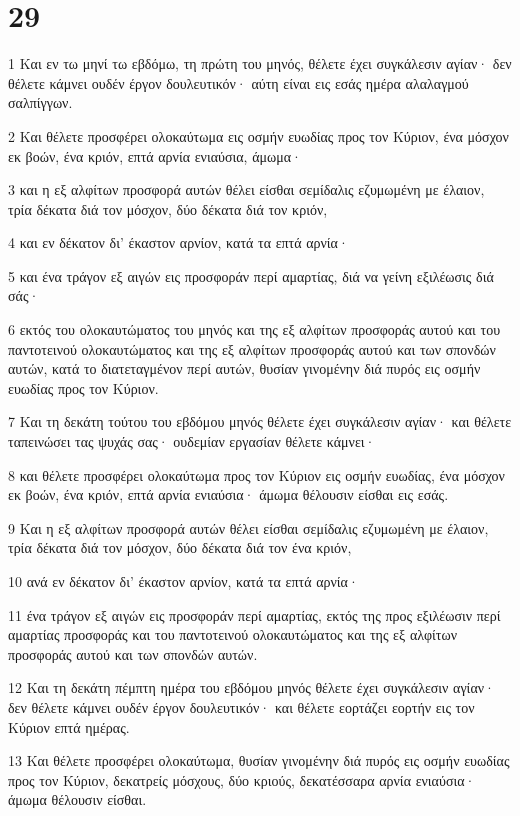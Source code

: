 \chapter{29}

\par 1 Και εν τω μηνί τω εβδόμω, τη πρώτη του μηνός, θέλετε έχει συγκάλεσιν αγίαν· δεν θέλετε κάμνει ουδέν έργον δουλευτικόν· αύτη είναι εις εσάς ημέρα αλαλαγμού σαλπίγγων.
\par 2 Και θέλετε προσφέρει ολοκαύτωμα εις οσμήν ευωδίας προς τον Κύριον, ένα μόσχον εκ βοών, ένα κριόν, επτά αρνία ενιαύσια, άμωμα·
\par 3 και η εξ αλφίτων προσφορά αυτών θέλει είσθαι σεμίδαλις εζυμωμένη με έλαιον, τρία δέκατα διά τον μόσχον, δύο δέκατα διά τον κριόν,
\par 4 και εν δέκατον δι' έκαστον αρνίον, κατά τα επτά αρνία·
\par 5 και ένα τράγον εξ αιγών εις προσφοράν περί αμαρτίας, διά να γείνη εξιλέωσις διά σάς·
\par 6 εκτός του ολοκαυτώματος του μηνός και της εξ αλφίτων προσφοράς αυτού και του παντοτεινού ολοκαυτώματος και της εξ αλφίτων προσφοράς αυτού και των σπονδών αυτών, κατά το διατεταγμένον περί αυτών, θυσίαν γινομένην διά πυρός εις οσμήν ευωδίας προς τον Κύριον.
\par 7 Και τη δεκάτη τούτου του εβδόμου μηνός θέλετε έχει συγκάλεσιν αγίαν· και θέλετε ταπεινώσει τας ψυχάς σας· ουδεμίαν εργασίαν θέλετε κάμνει·
\par 8 και θέλετε προσφέρει ολοκαύτωμα προς τον Κύριον εις οσμήν ευωδίας, ένα μόσχον εκ βοών, ένα κριόν, επτά αρνία ενιαύσια· άμωμα θέλουσιν είσθαι εις εσάς.
\par 9 Και η εξ αλφίτων προσφορά αυτών θέλει είσθαι σεμίδαλις εζυμωμένη με έλαιον, τρία δέκατα διά τον μόσχον, δύο δέκατα διά τον ένα κριόν,
\par 10 ανά εν δέκατον δι' έκαστον αρνίον, κατά τα επτά αρνία·
\par 11 ένα τράγον εξ αιγών εις προσφοράν περί αμαρτίας, εκτός της προς εξιλέωσιν περί αμαρτίας προσφοράς και του παντοτεινού ολοκαυτώματος και της εξ αλφίτων προσφοράς αυτού και των σπονδών αυτών.
\par 12 Και τη δεκάτη πέμπτη ημέρα του εβδόμου μηνός θέλετε έχει συγκάλεσιν αγίαν· δεν θέλετε κάμνει ουδέν έργον δουλευτικόν· και θέλετε εορτάζει εορτήν εις τον Κύριον επτά ημέρας.
\par 13 Και θέλετε προσφέρει ολοκαύτωμα, θυσίαν γινομένην διά πυρός εις οσμήν ευωδίας προς τον Κύριον, δεκατρείς μόσχους, δύο κριούς, δεκατέσσαρα αρνία ενιαύσια· άμωμα θέλουσιν είσθαι.
